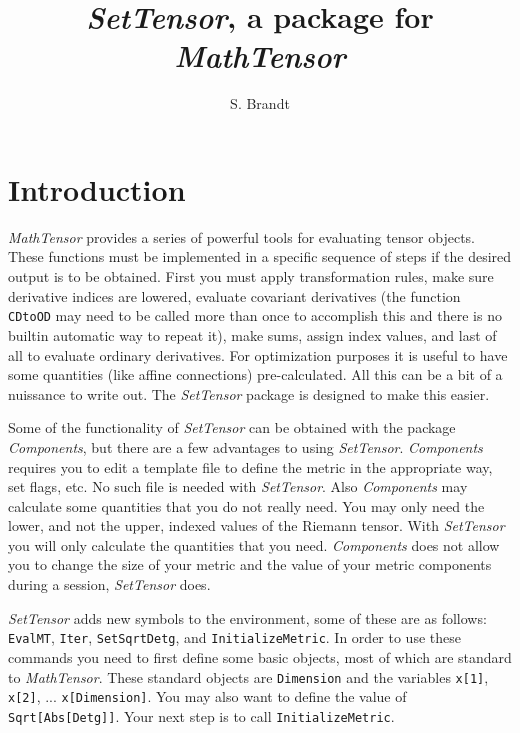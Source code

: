 

\title{{\it SetTensor}, a package for {\it MathTensor}}
\author{S. Brandt}
\maketitle
\section{Introduction}
{}

{\it MathTensor} provides a series of powerful tools for evaluating
tensor objects.  These functions must be implemented in a specific
sequence of steps if the desired output is to be obtained.  First
you must apply transformation rules, make sure derivative indices
are lowered, evaluate covariant derivatives (the function {\tt
CDtoOD} may need to be called more than once to accomplish this
and there is no builtin automatic way to repeat it), make sums,
assign index values, and last of all to evaluate ordinary derivatives.
For optimization purposes it is useful to have some quantities
(like affine connections) pre-calculated.
All this can be a bit of a nuissance to write out.  The {\it
SetTensor} package is designed to make this easier.

Some of the functionality of {\it SetTensor}
can be obtained with the package
{\it Components}, but there are a few advantages to using
{\it SetTensor}.  {\it Components} requires you to edit a template file
to define the metric in the appropriate way, set flags, etc.
No such file is needed with {\it SetTensor}.  Also {\it Components}
may calculate
some quantities that you do not really need.  You may only need
the lower, and not the upper, indexed values of the Riemann
tensor.  With {\it SetTensor} you will only calculate the quantities
that you need.  {\it Components} does not allow you to change the
size of your metric and the value of your metric components
during a session, {\it SetTensor} does.

{\it SetTensor} adds new symbols to the environment, some of these
are as follows:
{\tt EvalMT}, {\tt Iter}, {\tt SetSqrtDetg},
and {\tt InitializeMetric}.  In order to use
these commands you need to
first define some basic objects, most of which are standard to
{\it MathTensor}.  These standard objects are {\tt Dimension} and the
variables {\tt x[1]}, {\tt x[2]}, ... {\tt x[Dimension]}.  You may also want
to define the value of {\tt Sqrt[Abs[Detg]]}.  Your next step is
to call {\tt InitializeMetric}.

